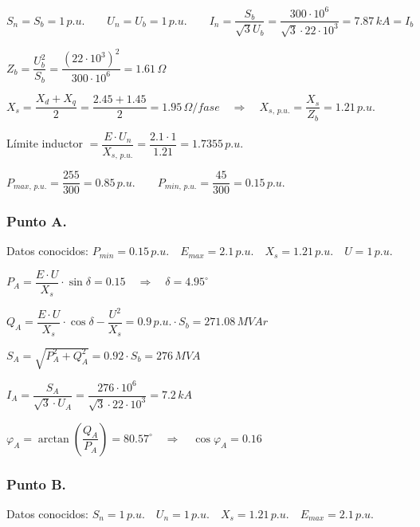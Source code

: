 		\vspace{0.25cm}
		$S_n = S_b = 1\,p.u.\qquad U_n = U_b = 1\,p.u. \qquad I_n = \dfrac{S_b}{\sqrt{3}U_b} = \dfrac{300\cdot 10^6}{\sqrt{3}\cdot 22\cdot 10^3} = 7.87\,kA = I_b$
		
		\vspace{0.1cm}
		$Z_b = \dfrac{U_b^2}{S_b} = \dfrac{(22\cdot 10^3)^2}{300\cdot 10^6} = 1.61\,\varOmega$
		
		\vspace{0.1cm}
		$X_s = \dfrac{X_d + X_q}{2} = \dfrac{2.45 + 1.45}{2} = 1.95\,\varOmega/fase\quad \Rightarrow \quad X_{s,\,p.u.} = \dfrac{X_s}{Z_b} = 1.21\,p.u.$
		
		\vspace{0.1cm}
		Límite inductor $=\dfrac{E\cdot U_n}{X_{s,\,p.u.}} = \dfrac{2.1\cdot 1}{1.21} = 1.7355\,p.u.$
		
		\vspace{0.1cm}
		$P_{max,\,p.u.} = \dfrac{255}{300} = 0.85\,p.u.\qquad P_{min,\,p.u.} = \dfrac{45}{300} = 0.15\,p.u.$
		
		\vspace{-0.1cm}
		\subsubsection*{Punto A.}
			Datos conocidos: $P_{min} = 0.15\,p.u.\quad E_{max} = 2.1\,p.u.\quad X_s = 1.21\,p.u.\quad U = 1\,p.u.$
			
			\vspace{0.1cm}
			$P_A = \dfrac{E\cdot U}{X_s}\cdot \sin \delta = 0.15 \quad \Rightarrow \quad \delta = 4.95^\circ$
			
			\vspace{0.1cm}
			$Q_A = \dfrac{E\cdot U}{X_s}\cdot \cos \delta - \dfrac{U^2}{X_s} = 0.9\,p.u.\cdot S_b = 271.08\,MV\!Ar$
			
			\vspace{0.1cm}
			$S_A = \sqrt{P_A^2+Q_A^2} = 0.92\cdot S_b = 276\,MV\!A$
			
			\vspace{0.1cm}
			$I_A = \dfrac{S_A}{\sqrt{3}\cdot U_A} = \dfrac{276\cdot 10^6}{\sqrt{3}\cdot 22\cdot 10^3} = 7.2\,kA$
			
			\vspace{0.1cm}
			$\varphi_A = \arctan \left(\dfrac{Q_A}{P_A}\right) = 80.57^\circ \quad \Rightarrow \quad \cos \varphi_A = 0.16$
		
		\vspace{-0.1cm}
		\subsubsection*{Punto B.}
			Datos conocidos: $S_n = 1\,p.u.\quad U_n = 1\,p.u.\quad X_s = 1.21\,p.u.\quad E_{max} = 2.1\,p.u.$
			
